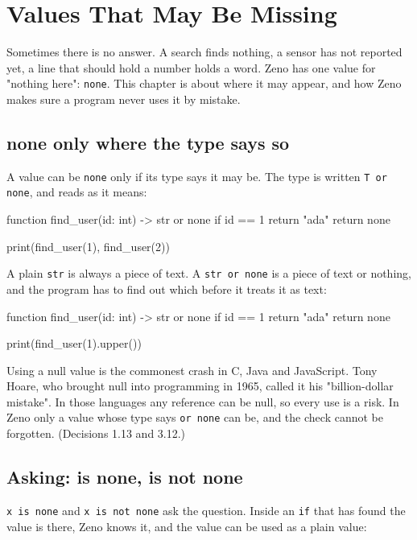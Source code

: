 \chapter{Values That May Be Missing}\label{ch-none}

Sometimes there is no answer. A search finds nothing, a sensor has not
reported yet, a line that should hold a number holds a word. Zeno has
one value for "nothing here": \verb|none|. This chapter is about where
it may appear, and how Zeno makes sure a program never uses it by
mistake.

\section{none only where the type says so}

A value can be \verb|none| only if its type says it may be. The type is
written \verb|T or none|, and reads as it means:

\begin{zeno}
function find_user(id: int) -> str or none {
    if id == 1 {
        return "ada"
    }
    return none
}

print(find_user(1), find_user(2))
\end{zeno}

A plain \verb|str| is always a piece of text. A \verb|str or none| is a
piece of text or nothing, and the program has to find out which before
it treats it as text:

\begin{zeno}[fails=yes]
function find_user(id: int) -> str or none {
    if id == 1 {
        return "ada"
    }
    return none
}

print(find_user(1).upper())
\end{zeno}

\begin{why}
Using a null value is the commonest crash in C, Java and JavaScript.
Tony Hoare, who brought null into programming in 1965, called it his
"billion-dollar mistake". In those languages any reference can be
null, so every use is a risk. In Zeno only a value whose type says
\verb|or none| can be, and the check cannot be forgotten.
(Decisions 1.13 and 3.12.)
\end{why}

\section{Asking: is none, is not none}

\verb|x is none| and \verb|x is not none| ask the question. Inside an
\verb|if| that has found the value is there, Zeno knows it, and the
value can be used as a plain value:

